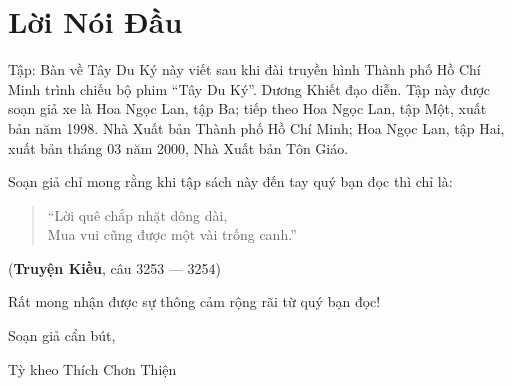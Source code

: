 \chapter*{Lời Nói Đầu} %
\label{cha:loi_noi_dau}

Tập: Bàn về Tây Du Ký này viết sau khi đài truyền hình Thành phố Hồ Chí Minh trình chiếu bộ phim ``Tây Du Ký''. Dương Khiết đạo diễn. Tập này được soạn giả xe là Hoa Ngọc Lan, tập Ba; tiếp theo Hoa Ngọc Lan, tập Một, xuất bản năm 1998. Nhà Xuất bản Thành phố Hồ Chí Minh; Hoa Ngọc Lan, tập Hai, xuất bản tháng 03 năm 2000, Nhà Xuất bản Tôn Giáo.

Soạn giả chỉ mong rằng khi tập sách này đến tay quý bạn đọc thì chỉ là:

\begin{verse}
\begin{itshape}
``Lời quê chắp nhặt dông dài,\\
Mua vui cũng được một vài trống canh.''
\end{itshape}
\end{verse}

\hfill
({\bf Truyện Kiều}, câu 3253 — 3254)

Rất mong nhận được sự thông cảm rộng rãi từ quý bạn đọc!

\vfill
\hfill
\begin{minipage}{0.6\textwidth}
\begin{center}
Soạn giả cẩn bút,

Tỳ kheo Thích Chơn Thiện
\end{center}
\end{minipage}
\vfill
